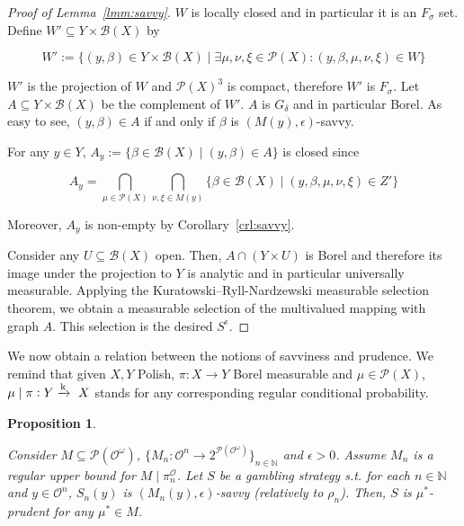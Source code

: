 \documentclass[11pt]{article}
\theoremstyle{definition}
\theoremstyle{plain}
\newtheorem{proposition}{Proposition}%
\newcommand{\Nats}{\mathbb{N}}
\newcommand{\Sq}[2]{\{#1\}_{#2 \in \Nats}}
\newcommand{\Sqn}[1]{\Sq{#1}{n}}
\newcommand{\M}{\xrightarrow{\textnormal{k}}}
\newcommand{\PM}{\mathcal{P}}
\newcommand{\Ob}{\mathcal{O}}
\newcommand{\OO}{\Ob^\omega}
\newcommand{\PO}{\pi^\Ob}
\newcommand{\PMO}{\PM(\OO)}
\newcommand{\Gm}{\mathcal{B}}
\begin{document}
\begin{proof}[Proof of Lemma~\ref{lmm:savvy}]
$W$ is locally closed and in particular it is an $F_\sigma$ set. Define $W' \subseteq Y \times \Gm\left(X\right)$ by

$$W':=\{\left(y,\beta\right) \in Y \times \Gm\left(X\right) \mid \exists \mu,\nu,\xi \in \PM\left(X\right): \left(y,\beta,\mu,\nu,\xi\right) \in W\}$$

$W'$ is the projection of $W$ and $\PM\left(X\right)^3$ is compact, therefore $W'$ is $F_\sigma$. Let $A \subseteq Y \times \Gm\left(X\right)$ be the complement of $W'$. $A$ is $G_\delta$ and in particular Borel. As easy to see, $\left(y,\beta\right) \in A$ if and only if $\beta$ is $\left(M\left(y\right),\epsilon\right)$-savvy.

For any $y \in Y$, $A_y:=\{\beta \in \Gm\left(X\right) \mid \left(y,\beta\right) \in A\}$ is closed since

$$A_y = \bigcap_{\mu \in \PM\left(X\right)} \bigcap_{\nu,\xi \in M\left(y\right)} \{\beta \in \Gm\left(X\right) \mid \left(y,\beta,\mu,\nu,\xi\right) \in Z'\}$$

Moreover, $A_y$ is non-empty by Corollary~\ref{crl:savvy}.

Consider any $U \subseteq \Gm\left(X\right)$ open. Then, $A \cap \left(Y \times U\right)$ is Borel and therefore its image under the projection to $Y$ is analytic and in particular universally measurable. Applying the Kuratowski--Ryll-Nardzewski measurable selection theorem, we obtain a measurable selection of the multivalued mapping with graph $A$. This selection is the desired $S^\epsilon$.
\end{proof}

We now obtain a relation between the notions of savviness and prudence. We remind that given $X,Y$ Polish, $\pi: X \rightarrow Y$ Borel measurable and $\mu \in \PM\left(X\right)$, $\mu \mid \pi: Y \M\ X$ stands for any corresponding regular conditional probability.

\begin{samepage}
\begin{proposition}
\label{crl:savvy_is_prudent}

Consider $M \subseteq \PMO$, $\Sqn{M_n: \Ob^n \rightarrow 2^{\PMO}}$ and $\epsilon > 0$. Assume $M_n$ is a regular upper bound for $M \mid \PO_n$. Let $S$ be a gambling strategy s.t. for each $n \in \Nats$ and $y \in \Ob^n$, $S_n\left(y\right)$ is $\left(M_n(y),\epsilon\right)$-savvy (relatively to $\rho_n$). Then, $S$ is $\mu^*$-prudent for any $\mu^* \in M$.

\end{proposition}
\end{samepage}
\end{document}
